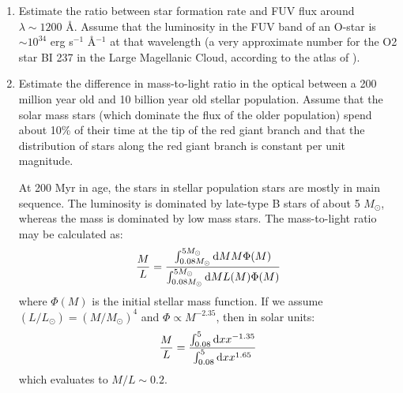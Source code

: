 \begin{enumerate} 
\item Estimate the ratio between star formation rate and FUV flux
    around $\lambda \sim 1200$ \AA.
    Assume that the luminosity in the FUV band of an O-star
    is $\sim 10^{34}$ erg s$^{-1}$ \AA$^{-1}$ at that wavelength (a
    very approximate number for the O2 star BI 237 in the Large
    Magellanic Cloud, according to the atlas of \citealt{smith12a}).
\item Estimate the difference in mass-to-light ratio in the optical
    between a 200 million year old and 10 billion year old stellar
    population. Assume that the solar mass stars (which dominate the
    flux of the older population) spend about 10\% of their time at
    the tip of the red giant branch and that the distribution of stars
    along the red giant branch is constant per unit magnitude.

\begin{answer}
At 200 Myr in age, the stars in stellar population stars are mostly in
main sequence. The luminosity is dominated by late-type B stars of
about 5 $M_\odot$, whereas the mass is dominated by low mass
stars. The mass-to-light ratio may be calculated as:
\begin{equation}
\frac{M}{L} = \frac{\int_{0.08M_\odot}^{5 M_\odot} {\rm d}M M \Phi(M)}
{\int_{0.08M_\odot}^{5 M_\odot} {\rm d}M L(M) \Phi(M)}
\end{equation}
where $\Phi(M)$ is the initial stellar mass function. If we assume
$(L/L_\odot) = (M/M_\odot)^4$ and $\Phi\propto M^{-2.35}$, then in
solar units:
\begin{equation}
\frac{M}{L} = \frac{\int_{0.08}^{5} {\rm d}x x^{-1.35}}
{\int_{0.08}^{5} {\rm d}x x^{1.65}}
\end{equation}
which evaluates to $M/L\sim 0.2$. 


\end{answer}
\end{enumerate}
